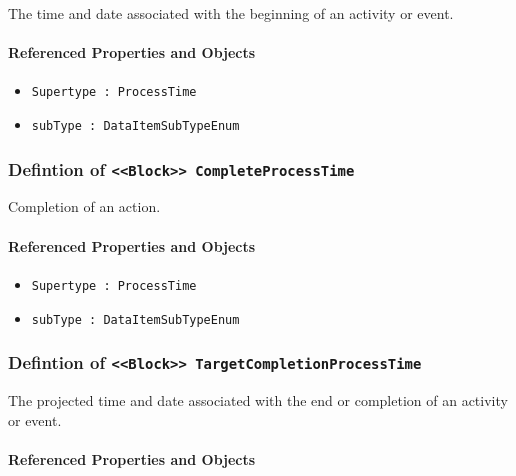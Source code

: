 \FloatBarrier

The time and date associated with the beginning of an activity or event.

\FloatBarrier
\paragraph{Referenced Properties and Objects}

\begin{itemize}
\item \texttt{Supertype : ProcessTime}

\item \texttt{subType : DataItemSubTypeEnum}

\end{itemize}
\FloatBarrier
\subsubsection{Defintion of \texttt{<<Block>> CompleteProcessTime}}
  \label{type:CompleteProcessTime}

\FloatBarrier

Completion of an action.

\FloatBarrier
\paragraph{Referenced Properties and Objects}

\begin{itemize}
\item \texttt{Supertype : ProcessTime}

\item \texttt{subType : DataItemSubTypeEnum}

\end{itemize}
\FloatBarrier
\subsubsection{Defintion of \texttt{<<Block>> TargetCompletionProcessTime}}
  \label{type:TargetCompletionProcessTime}

\FloatBarrier

The projected time and date associated with the end or completion of an activity or event.

\FloatBarrier
\paragraph{Referenced Properties and Objects}


